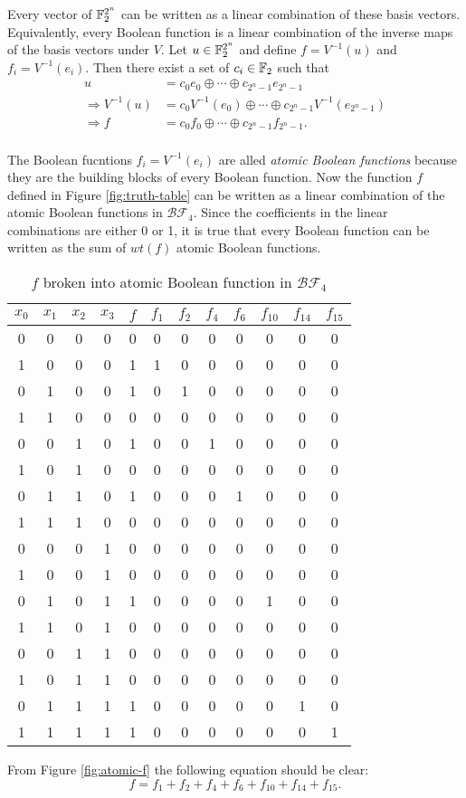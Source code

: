 \par Every vector of $\mathbb{F}_2^{2^n}$ can be written as a linear combination of these
basis vectors. Equivalently, every Boolean function is a linear combination of the
inverse maps of the basis vectors under $V$. Let $u\in\mathbb{F}_2^{2^n}$ and define
$f=V^{-1}(u)$ and $f_i=V^{-1}(e_i)$. Then there exist a set of $c_i\in\mathbb{F}_2$ such that
\begin{align*}
						  u        &=c_0e_0\oplus\cdots\oplus c_{2^n-1}e_{2^n-1} \\
	\Rightarrow V^{-1}(u)&=c_0V^{-1}(e_0)\oplus\cdots\oplus c_{2^n-1}V^{-1}(e_{2^n-1}) \\
	\Rightarrow f        &=c_0f_0\oplus\cdots\oplus c_{2^n-1}f_{2^n-1}.\\
\end{align*}

\par The Boolean fucntions $f_i=V^{-1}(e_i)$ are alled {\em atomic Boolean functions}
because they are the building blocks of every Boolean function. Now the function
$f$ defined in Figure \ref{fig:truth-table} can be written as a linear combination
of the atomic Boolean functions in $\mathcal{BF}_4$. Since the coefficients in the
linear combinations are either 0 or 1, it is true that every Boolean function can be
written as the sum of $wt(f)$ atomic Boolean functions.
\begin{table}[h!]\label{tab:atomic-f}
	\centering
  \begin{tabular}{|c|c|c|c|c|c|c|c|c|c|c|c|}
    \hline
    $x_0$&$x_1$&$x_2$&$x_3$&$f$&$f_1$&$f_2$&$f_4$&$f_6$&$f_{10}$&$f_{14}$&$f_{15}$\\
    \hline
    0&0&0&0&0&0&0&0&0&0&0&0\\
    1&0&0&0&1&1&0&0&0&0&0&0\\
    0&1&0&0&1&0&1&0&0&0&0&0\\
    1&1&0&0&0&0&0&0&0&0&0&0\\
    0&0&1&0&1&0&0&1&0&0&0&0\\
    1&0&1&0&0&0&0&0&0&0&0&0\\
    0&1&1&0&1&0&0&0&1&0&0&0\\
    1&1&1&0&0&0&0&0&0&0&0&0\\
    0&0&0&1&0&0&0&0&0&0&0&0\\
    1&0&0&1&0&0&0&0&0&0&0&0\\
    0&1&0&1&1&0&0&0&0&1&0&0\\
    1&1&0&1&0&0&0&0&0&0&0&0\\
    0&0&1&1&0&0&0&0&0&0&0&0\\
    1&0&1&1&0&0&0&0&0&0&0&0\\
    0&1&1&1&1&0&0&0&0&0&1&0\\
    1&1&1&1&1&0&0&0&0&0&0&1\\
  	\hline
	\end{tabular}
	\caption{$f$ broken into atomic Boolean function in $\mathcal{BF}_4$}
\end{table}
\par From Figure \ref{fig:atomic-f} the following equation should be clear:
\[
f=f_1+f_2+f_4+f_6+f_{10}+f_{14}+f_{15}.
\]

